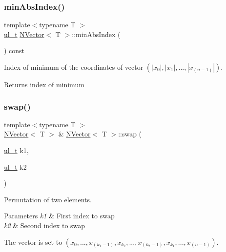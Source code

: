 \subsubsection{\texorpdfstring{minAbsIndex()}{minAbsIndex()}}
{\footnotesize\ttfamily template$<$typename T $>$ \\
\mbox{\hyperlink{typedef_8h_a1b140a2034db3f5dfe18a987745df43a}{ul\+\_\+t}} \mbox{\hyperlink{class_n_vector}{N\+Vector}}$<$ T $>$\+::min\+Abs\+Index (\begin{DoxyParamCaption}{ }\end{DoxyParamCaption}) const}



Index of minimum of the coordinates of vector $ (|x_0|, |x_1|, ..., |x_{(n-1)}|) $. 

\begin{DoxyReturn}{Returns}
index of minimum 
\end{DoxyReturn}
\mbox{\label{class_n_vector_a8ea2e2cffa2c3053d835d05a571dac88}} 
\subsubsection{\texorpdfstring{swap()}{swap()}}
{\footnotesize\ttfamily template$<$typename T $>$ \\
\mbox{\hyperlink{class_n_vector}{N\+Vector}}$<$ T $>$ \& \mbox{\hyperlink{class_n_vector}{N\+Vector}}$<$ T $>$\+::swap (\begin{DoxyParamCaption}\item[{\mbox{\hyperlink{typedef_8h_a1b140a2034db3f5dfe18a987745df43a}{ul\+\_\+t}}}]{k1,  }\item[{\mbox{\hyperlink{typedef_8h_a1b140a2034db3f5dfe18a987745df43a}{ul\+\_\+t}}}]{k2 }\end{DoxyParamCaption})}



Permutation of two elements. 


\begin{DoxyParams}{Parameters}
{\em k1} & First index to swap \\
\hline
{\em k2} & Second index to swap\\
\hline
\end{DoxyParams}
The vector is set to $ (x_0, ..., x_{(k_1 - 1)}, x_{k_2}, ..., x_{(k_2 - 1)}, x_{k_1}, ..., x_{(n-1)}) $. \mbox{\label{class_n_vector_aabe8585ef2659ce3fa7872c2b96e3b20}} 
